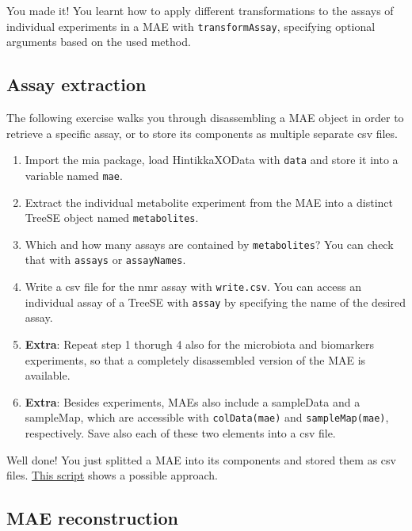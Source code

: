 \documentclass[
]{book}
\providecommand{\tightlist}{%
  \setlength{\itemsep}{0pt}\setlength{\parskip}{0pt}}
\begin{document}
You made it! You learnt how to apply different transformations to the assays
of individual experiments in a MAE with \texttt{transformAssay}, specifying optional
arguments based on the used method.

\hypertarget{assay-extraction}{%
\subsection{Assay extraction}\label{assay-extraction}}

The following exercise walks you through disassembling a MAE object in
order to retrieve a specific assay, or to store its components as
multiple separate csv files.

\begin{enumerate}
\def\labelenumi{\arabic{enumi}.}
\tightlist
\item
  Import the mia package, load HintikkaXOData with \texttt{data} and store it into a
  variable named \texttt{mae}.
\item
  Extract the individual metabolite experiment from the MAE into a distinct
  TreeSE object named \texttt{metabolites}.
\item
  Which and how many assays are contained by \texttt{metabolites}? You can check that
  with \texttt{assays} or \texttt{assayNames}.
\item
  Write a csv file for the nmr assay with \texttt{write.csv}. You can access an
  individual assay of a TreeSE with \texttt{assay} by specifying the name of the
  desired assay.
\item
  \textbf{Extra}: Repeat step 1 thorugh 4 also for the microbiota and biomarkers
  experiments, so that a completely disassembled version of the MAE is available.
\item
  \textbf{Extra}: Besides experiments, MAEs also include a sampleData and a sampleMap,
  which are accessible with \texttt{colData(mae)} and \texttt{sampleMap(mae)}, respectively.
  Save also each of these two elements into a csv file.
\end{enumerate}

Well done! You just splitted a MAE into its components and stored them as csv files.
\href{https://github.com/JuliaTurkuDataScience/MicrobiomeAnalysis.jl/blob/main/src/assets/XO_preprocess.R}{This script}
shows a possible approach.

\hypertarget{mae-reconstruction}{%
\subsection{MAE reconstruction}\label{mae-reconstruction}}
\end{document}
